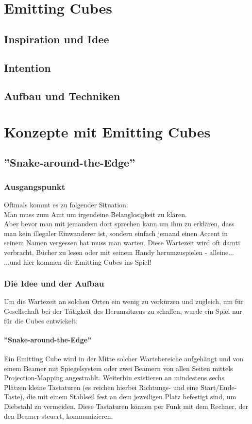 \documentclass[pdftex,12pt,a4paper]{report}
\begin{document}
\tableofcontents
\newpage

\chapter{Emitting Cubes }
\section{Inspiration und Idee}
\section{Intention}
\section{Aufbau und Techniken}



\chapter{Konzepte mit Emitting Cubes}
\section{''Snake-around-the-Edge''}
\subsection{Ausgangspunkt}
Oftmals kommt es zu folgender Situation:\\
Man muss zum Amt um irgendeine Belanglosigkeit zu klären.\\
Aber bevor man mit jemandem dort sprechen kann um ihm zu erklären, dass man kein illegaler Einwanderer ist, sondern einfach jemand einen Accent in seinem Namen vergessen hat muss man warten.
Diese Wartezeit wird oft damti verbracht, Bücher zu lesen oder mit seinem Handy herumzuspielen - alleine...\\
...und hier kommen die Emitting Cubes ins Spiel!

\subsection{Die Idee und der Aufbau}
Um die Wartezeit an solchen Orten ein wenig zu verkürzen und zugleich, um für Gesellschaft bei der Tätigkeit des Herumsitzens zu schaffen, wurde ein Spiel nur für die Cubes entwickelt:\\
\\
\textbf{''Snake-around-the-Edge''}
\\\\
Ein Emitting Cube wird in der Mitte solcher Wartebereiche aufgehängt und von einem Beamer mit Spiegelsystem oder zwei Beamern von allen Seiten mittels Projection-Mapping angestrahlt.
Weiterhin existieren an mindestens sechs Plätzen kleine Tastaturen (es reichen hierbei Richtungs- und eine Start/Ende-Taste), die mit einem Stahlseil fest an dem jeweiligen Platz befestigt sind, um Diebstahl zu vermeiden.
Diese Tastaturen können per Funk mit dem Rechner, der den Beamer steuert, kommunizieren.
\end{document}
